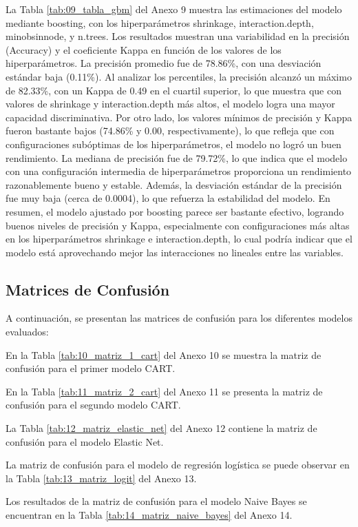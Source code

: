 \documentclass[12pt,a4paper,onecolumn]{article}
\begin{document}
La Tabla \ref{tab:09_tabla_gbm} del Anexo 9 muestra las estimaciones del modelo mediante boosting, con los hiperparámetros shrinkage, interaction.depth, minobsinnode, y n.trees. Los resultados muestran una variabilidad en la precisión (Accuracy) y el coeficiente Kappa en función de los valores de los hiperparámetros. La precisión promedio fue de 78.86\%, con una desviación estándar baja (0.11\%). Al analizar los percentiles, la precisión alcanzó un máximo de 82.33\%, con un Kappa de 0.49 en el cuartil superior, lo que muestra que con valores de shrinkage y interaction.depth más altos, el modelo logra una mayor capacidad discriminativa. Por otro lado, los valores mínimos de precisión y Kappa fueron bastante bajos (74.86\% y 0.00, respectivamente), lo que refleja que con configuraciones subóptimas de los hiperparámetros, el modelo no logró un buen rendimiento. La mediana de precisión fue de 79.72\%, lo que indica que el modelo con una configuración intermedia de hiperparámetros proporciona un rendimiento razonablemente bueno y estable. Además, la desviación estándar de la precisión fue muy baja (cerca de 0.0004), lo que refuerza la estabilidad del modelo. En resumen, el modelo ajustado por boosting parece ser bastante efectivo, logrando buenos niveles de precisión y Kappa, especialmente con configuraciones más altas en los hiperparámetros shrinkage e interaction.depth, lo cual podría indicar que el modelo está aprovechando mejor las interacciones no lineales entre las variables.

\subsection{Matrices de Confusión}

A continuación, se presentan las matrices de confusión para los diferentes modelos evaluados:

En la Tabla \ref{tab:10_matriz_1_cart} del Anexo 10 se muestra la matriz de confusión para el primer modelo CART.

En la Tabla \ref{tab:11_matriz_2_cart} del Anexo 11 se presenta la matriz de confusión para el segundo modelo CART.

La Tabla \ref{tab:12_matriz_elastic_net} del Anexo 12 contiene la matriz de confusión para el modelo Elastic Net.

La matriz de confusión para el modelo de regresión logística se puede observar en la Tabla \ref{tab:13_matriz_logit} del Anexo 13.

Los resultados de la matriz de confusión para el modelo Naive Bayes se encuentran en la Tabla \ref{tab:14_matriz_naive_bayes} del Anexo 14.
\end{document}
